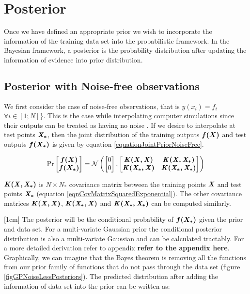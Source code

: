 \section{Posterior}\label{secPosterior}
Once we have defined an appropriate prior we wish to incorporate the information of the training data set into the probabilistic framework. In the Bayesian framework, a posterior is the probability distribution after updating the information of evidence into prior distribution. 


\subsection{Posterior with Noise-free observations}\label{subSecPosteriorNoiseFree}
We first consider the case of noise-free observations, that is $y(x_{i}) = f_{i}$ $ \forall i \in [1; N] \}$. This is the case while interpolating computer simulations since their outputs can be treated as having no noise \cite{sacks1989design}. If we desire to interpolate at test points $\bm{\mathit{X_{*}}}$, then the joint distribution of the training outputs $\boldsymbol{f(X)}$ and test outputs $\boldsymbol{f(X_{*})}$ is given by equation \ref{equationJointPriorNoiseFree}.

\begin{equation}\label{equationJointPriorNoiseFree}
\Pr\left [ \begin{matrix}
\boldsymbol{f(X)}
\\ \boldsymbol{f(X_{*})}
\end{matrix} \right ] = 
\mathcal{N}\left (\left [ \begin{matrix} 0 \\ 0 \end{matrix} \right ]
, 
\left [ \begin{matrix}
\bm{\mathit{K(X, X)}} & \bm{\mathit{K(X, X_{*})}}\\ 
\bm{\mathit{K(X_{*}, X)}} & \bm{\mathit{K(X_{*}, X_{*})}}
\end{matrix} \right ]
\right)
\end{equation}

$\bm{\mathit{K(X, X_{*})}}$ is $N \times N_{*}$ covariance matrix between the training points $\bm{\mathit{X}}$ and test points $\bm{\mathit{X_{*}}}$ (equation \ref{eqnCovMatrixSquaredExponential}). The other covariance matrices $\bm{\mathit{K(X, X)}}$, $\bm{\mathit{K(X_{*}, X)}}$ and $\bm{\mathit{K(X_{*}, X_{*})}}$ can be computed similarly. 

[1cm]
The posterior will be the conditional probability of $\boldsymbol{f(X_{*})}$ given the prior and data set. For a multi-variate Gaussian prior the conditional posterior distribution is also a multi-variate Gaussian and can be calculated tractably. For a more detailed derivation refer to appendix \textbf{refer to the appendix here}. Graphically, we can imagine that the Bayes theorem is removing all the functions from our prior family of functions that do not pass through the data set (figure \ref{figGPNoiseLessPosteriors}). The predicted distribution after adding the information of data set into the prior can be written as:

